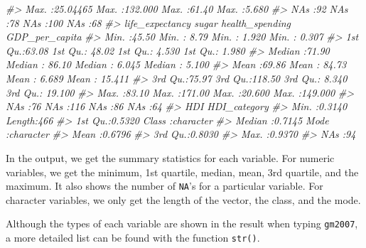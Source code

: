 \documentclass[
]{book}
\newenvironment{Shaded}{\begin{snugshade}}{\end{snugshade}}
\newcommand{\CommentTok}[1]{\textcolor[rgb]{0.56,0.35,0.01}{\textit{#1}}}
\begin{document}
\begin{Shaded}
\begin{Highlighting}[]
\CommentTok{\#\textgreater{}  Max.   :25.04465   Max.   :132.000      Max.   :61.40   Max.   :5.680  }
\CommentTok{\#\textgreater{}  NA\textquotesingle{}s   :92         NA\textquotesingle{}s   :78           NA\textquotesingle{}s   :100     NA\textquotesingle{}s   :68     }
\CommentTok{\#\textgreater{}  life\_expectancy     sugar        health\_spending  GDP\_per\_capita   }
\CommentTok{\#\textgreater{}  Min.   :45.50   Min.   :  8.79   Min.   : 1.920   Min.   :  0.307  }
\CommentTok{\#\textgreater{}  1st Qu.:63.08   1st Qu.: 48.02   1st Qu.: 4.530   1st Qu.:  1.980  }
\CommentTok{\#\textgreater{}  Median :71.90   Median : 86.10   Median : 6.045   Median :  5.100  }
\CommentTok{\#\textgreater{}  Mean   :69.86   Mean   : 84.73   Mean   : 6.689   Mean   : 15.411  }
\CommentTok{\#\textgreater{}  3rd Qu.:75.97   3rd Qu.:118.50   3rd Qu.: 8.340   3rd Qu.: 19.100  }
\CommentTok{\#\textgreater{}  Max.   :83.10   Max.   :171.00   Max.   :20.600   Max.   :149.000  }
\CommentTok{\#\textgreater{}  NA\textquotesingle{}s   :76      NA\textquotesingle{}s   :116      NA\textquotesingle{}s   :86       NA\textquotesingle{}s   :64       }
\CommentTok{\#\textgreater{}       HDI         HDI\_category      }
\CommentTok{\#\textgreater{}  Min.   :0.3140   Length:466        }
\CommentTok{\#\textgreater{}  1st Qu.:0.5320   Class :character  }
\CommentTok{\#\textgreater{}  Median :0.7145   Mode  :character  }
\CommentTok{\#\textgreater{}  Mean   :0.6796                     }
\CommentTok{\#\textgreater{}  3rd Qu.:0.8030                     }
\CommentTok{\#\textgreater{}  Max.   :0.9370                     }
\CommentTok{\#\textgreater{}  NA\textquotesingle{}s   :94}
\end{Highlighting}
\end{Shaded}

In the output, we get the summary statistics for each variable. For numeric variables, we get the minimum, 1st quartile, median, mean, 3rd quartile, and the maximum. It also shows the number of \texttt{NA}'s for a particular variable. For character variables, we only get the length of the vector, the class, and the mode.

Although the types of each variable are shown in the result when typing \texttt{gm2007}, a more detailed list can be found with the function \texttt{str()}.
\end{document}
